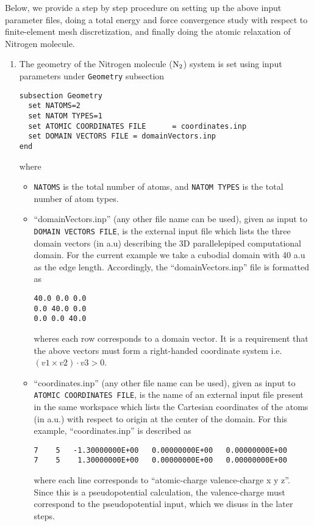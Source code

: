 Below, we provide a step by step procedure on setting up the above input parameter files, doing a total energy and force convergence study with respect to finite-element mesh discretization, and finally doing the atomic relaxation of Nitrogen molecule.
\begin{enumerate}
\item The geometry of the Nitrogen molecule (${\rm N}_{2}$) system is set using input parameters under \verb|Geometry| subsection
\begin{verbatim}
subsection Geometry
  set NATOMS=2
  set NATOM TYPES=1
  set ATOMIC COORDINATES FILE      = coordinates.inp 
  set DOMAIN VECTORS FILE = domainVectors.inp
end
\end{verbatim}
where
\begin{itemize}		

\item \verb|NATOMS| is the total number of atoms, and \verb|NATOM TYPES| is the total number of atom types.
	
\item``domainVectors.inp'' (any other file name can be used), given as input to \verb|DOMAIN VECTORS FILE|,  is the external input file which lists the three domain vectors (in a.u) describing the
3D parallelepiped computational domain. For the current example we take a cubodial domain with 40 a.u as the edge length. 
Accordingly, the ``domainVectors.inp'' file is formatted as  
\begin{verbatim}
40.0 0.0 0.0
0.0 40.0 0.0
0.0 0.0 40.0
\end{verbatim}
wheres each row corresponds to a domain vector.
It is a requirement that the above vectors must form a right-handed coordinate system i.e. $(v1 \times v2)\cdot v3 >0$.

\item ``coordinates.inp'' (any other file name can be used), given as input to \verb|ATOMIC COORDINATES FILE|, is the name of an external input file present in the same workspace which lists the Cartesian coordinates of the atoms (in a.u.) with respect to origin at the center of the domain. For this example, ``coordinates.inp'' is described as 
\begin{verbatim}
7    5   -1.30000000E+00   0.00000000E+00   0.00000000E+00
7    5    1.30000000E+00   0.00000000E+00   0.00000000E+00
\end{verbatim}
where each line corresponds to ``atomic-charge valence-charge x y z''. Since this is a pseudopotential calculation, the valence-charge must correspond to the pseudopotential input, which we disuss in the later steps.


\end{itemize}
\end{enumerate}
